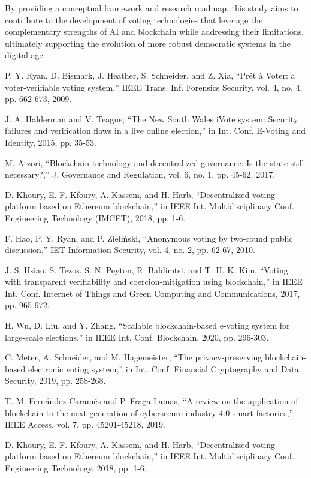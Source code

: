 \documentclass[conference]{IEEEtran}
\begin{document}
By providing a conceptual framework and research roadmap, this study aims to contribute to the development of voting technologies that leverage the complementary strengths of AI and blockchain while addressing their limitations, ultimately supporting the evolution of more robust democratic systems in the digital age.

\begin{thebibliography}{00}
 P. Y. Ryan, D. Bismark, J. Heather, S. Schneider, and Z. Xia, ``Prêt à Voter: a voter-verifiable voting system,'' IEEE Trans. Inf. Forensics Security, vol. 4, no. 4, pp. 662-673, 2009.

 J. A. Halderman and V. Teague, ``The New South Wales iVote system: Security failures and verification flaws in a live online election,'' in Int. Conf. E-Voting and Identity, 2015, pp. 35-53.

 M. Atzori, ``Blockchain technology and decentralized governance: Is the state still necessary?,'' J. Governance and Regulation, vol. 6, no. 1, pp. 45-62, 2017.

 D. Khoury, E. F. Kfoury, A. Kassem, and H. Harb, ``Decentralized voting platform based on Ethereum blockchain,'' in IEEE Int. Multidisciplinary Conf. Engineering Technology (IMCET), 2018, pp. 1-6.

 F. Hao, P. Y. Ryan, and P. Zieliński, ``Anonymous voting by two-round public discussion,'' IET Information Security, vol. 4, no. 2, pp. 62-67, 2010.

 J. S. Hsiao, S. Tezos, S. N. Peyton, R. Baldimtsi, and T. H. K. Kim, ``Voting with transparent verifiability and coercion-mitigation using blockchain,'' in IEEE Int. Conf. Internet of Things and Green Computing and Communications, 2017, pp. 965-972.

 H. Wu, D. Liu, and Y. Zhang, ``Scalable blockchain-based e-voting system for large-scale elections,'' in IEEE Int. Conf. Blockchain, 2020, pp. 296-303.

 C. Meter, A. Schneider, and M. Hagemeister, ``The privacy-preserving blockchain-based electronic voting system,'' in Int. Conf. Financial Cryptography and Data Security, 2019, pp. 258-268.

 T. M. Fernández-Caramés and P. Fraga-Lamas, ``A review on the application of blockchain to the next generation of cybersecure industry 4.0 smart factories,'' IEEE Access, vol. 7, pp. 45201-45218, 2019.

 D. Khoury, E. F. Kfoury, A. Kassem, and H. Harb, ``Decentralized voting platform based on Ethereum blockchain,'' in IEEE Int. Multidisciplinary Conf. Engineering Technology, 2018, pp. 1-6.


\end{thebibliography}
\end{document}
